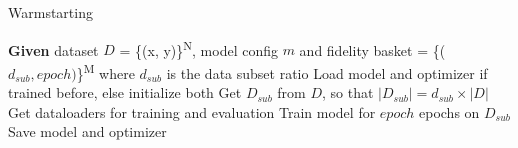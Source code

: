 \documentclass[a4paper,11pt]{article}
\begin{document}
 
\begin{algorithm}
	\caption{Warmstarting} 
	\begin{algorithmic}[1]
            \State \textbf{Given} dataset $D$ = \{(x, y)\}\textsuperscript{N},
            \Statex model config $m$ and
            \Statex fidelity basket = \{($d_{sub}, epoch)$\}\textsuperscript{M} where $d_{sub}$ is the data subset ratio
			\State Load model and optimizer if trained before, else initialize both
            \State Get $D_{sub}$ from $D$, so that $| D_{sub} | = d_{sub} \times |D| $
            \State Get dataloaders for training and evaluation
            \State Train model for $epoch$ epochs on $D_{sub}$
            \State Save model and optimizer
		\EndFor
	\end{algorithmic} 
\end{algorithm}
\end{document}
